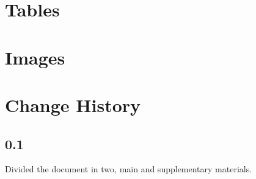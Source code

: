 \documentclass[10pt, a4paper, onecolumn]{article} %
\begin{document}
\listoffigures
\listoftables
\newpage


%

\section{Tables}














%

\section{Images}



\newpage

\section{Change History}

\subsection*{0.1}

Divided the document in two, main and supplementary materials.
\end{document}
